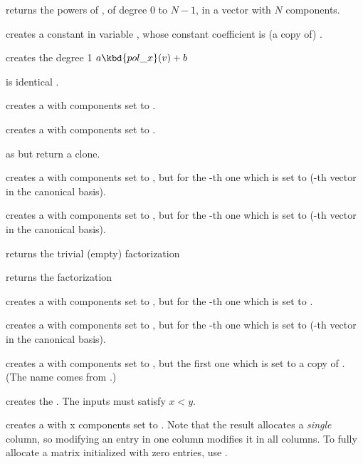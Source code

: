  returns the powers of
, of degree $0$ to $N-1$, in a vector with $N$ components.

 creates a constant  in variable
, whose constant coefficient is (a copy of) .

 creates the degree 1 
$a \kbd{pol\_x}(v) + b$

 is identical .

 creates a  with  components set to
.

 creates a  with  components set to
.

 as  but return a clone.

 creates a  with  components
set to , but for the -th one which is set to 
(-th vector in the canonical basis).

 creates a  with  components
set to , but for the -th one which is set to 
(-th vector in the canonical basis).

 returns the trivial (empty) factorization

 returns the factorization

 creates a  with 
components set to , but for the -th one which is set to
.

 creates a  with 
components set to , but for the -th one which is set to
 (-th vector in the canonical basis).

 creates a  with 
components set to , but the first one which is set to a copy
of . (The name comes from .)

\smallskip

 creates the  .
The inputs must satisfy $x < y$.

 creates a  with  x 
components set to . Note that the result allocates a
\emph{single} column, so modifying an entry in one column modifies it in
all columns. To fully allocate a matrix initialized with zero entries,
use .

